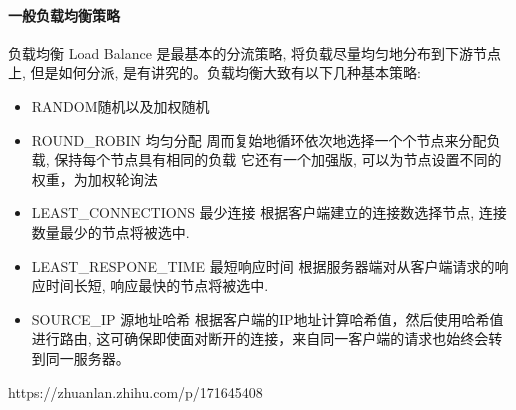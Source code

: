 \documentclass[../../../interview-questions.tex]{subfiles}
\begin{document}
\paragraph{一般负载均衡策略}

负载均衡 Load Balance 是最基本的分流策略, 将负载尽量均匀地分布到下游节点上, 但是如何分派, 是有讲究的。负载均衡大致有以下几种基本策略:

\begin{itemize}
    \item{RANDOM随机以及加权随机}
    \item{ROUND\_ROBIN 均匀分配
    周而复始地循环依次地选择一个个节点来分配负载, 保持每个节点具有相同的负载
    它还有一个加强版, 可以为节点设置不同的权重，为加权轮询法}
    \item {LEAST\_CONNECTIONS 最少连接
    根据客户端建立的连接数选择节点, 连接数量最少的节点将被选中.}
    \item {LEAST\_RESPONE\_TIME 最短响应时间
    根据服务器端对从客户端请求的响应时间长短, 响应最快的节点将被选中.}
    \item {SOURCE\_IP 源地址哈希
    根据客户端的IP地址计算哈希值，然后使用哈希值进行路由, 这可确保即使面对断开的连接，来自同一客户端的请求也始终会转到同一服务器。}
\end{itemize}

https://zhuanlan.zhihu.com/p/171645408
\end{document}
